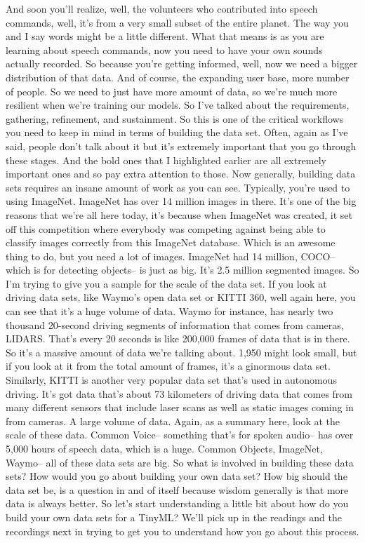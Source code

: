 And soon you'll realize, well, the volunteers who
contributed into speech commands, well, it's
from a very small subset of the entire planet.
The way you and I say words might be a little different.
What that means is as you are learning about speech commands,
now you need to have your own sounds actually recorded.
So because you're getting informed, well, now we
need a bigger distribution of that data.
And of course, the expanding user base, more number of people.
So we need to just have more amount of data,
so we're much more resilient when we're training our models.
So I've talked about the requirements, gathering, refinement, and sustainment.
So this is one of the critical workflows you
need to keep in mind in terms of building the data set.
Often, again as I've said, people don't talk about it
but it's extremely important that you go through these stages.
And the bold ones that I highlighted earlier
are all extremely important ones and so pay extra attention to those.
Now generally, building data sets requires an insane amount of work
as you can see.
Typically, you're used to using ImageNet.
ImageNet has over 14 million images in there.
It's one of the big reasons that we're all here today,
it's because when ImageNet was created, it
set off this competition where everybody was
competing against being able to classify images correctly
from this ImageNet database.
Which is an awesome thing to do, but you need a lot of images.
ImageNet had 14 million, COCO--
which is for detecting objects--
is just as big.
It's 2.5 million segmented images.
So I'm trying to give you a sample for the scale of the data set.
If you look at driving data sets, like Waymo's open data set or KITTI 360,
well again here, you can see that it's a huge volume of data.
Waymo for instance, has nearly two thousand 20-second driving segments
of information that comes from cameras, LIDARS.
That's every 20 seconds is like 200,000 frames of data that is in there.
So it's a massive amount of data we're talking about.
1,950 might look small, but if you look at it from the total amount of frames,
it's a ginormous data set.
Similarly, KITTI is another very popular data set
that's used in autonomous driving.
It's got data that's about 73 kilometers of driving data
that comes from many different sensors that include laser scans
as well as static images coming in from cameras.
A large volume of data.
Again, as a summary here, look at the scale of these data.
Common Voice-- something that's for spoken audio--
has over 5,000 hours of speech data, which is a huge.
Common Objects, ImageNet, Waymo--
all of these data sets are big.
So what is involved in building these data sets?
How would you go about building your own data set?
How big should the data set be, is a question in and of itself
because wisdom generally is that more data is always better.
So let's start understanding a little bit
about how do you build your own data sets for a TinyML?
We'll pick up in the readings and the recordings
next in trying to get you to understand how you go about this process.


